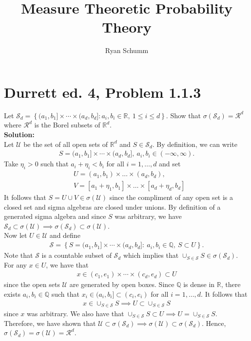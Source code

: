 \documentclass[12pt]{article}
\title{Measure Theoretic Probability Theory}
\author{Ryan Schumm}
\date{}
\newcommand{\Sd}{\mathcal{S}_d}
\newcommand{\U}{\mathcal{U}}
\begin{document}
    \maketitle
    \setlength{\parindent}{0pt}

    \section*{Durrett ed. 4, Problem 1.1.3}
    Let $\mathcal{S}_d = \left\{(a_1, b_1]\times\cdots\times(a_d, b_d]: a_i, b_i\in\mathbb R, \ 1 \leq i \leq d\right\}$. Show that 
    $\sigma\left(\mathcal S_d\right) = \mathcal R^d$ where $\mathcal R^d$ is the Borel subsets of $\mathbb R^d$.\\

    \textbf{Solution:}\\
    Let $\U$ be the set of all open sets of $\mathbb R^d$ and $S\in\Sd$. By definition, we can write
    \begin{align*}
        S = (a_1, b_1]\times\cdots\times(a_d, b_d], \ a_i, b_i\in(-\infty, \infty).
    \end{align*}
    Take $\eta_i > 0$ such that $a_i + \eta_i < b_i$ for all $i = 1,\ldots,d$ and set 
    \begin{align}
        &U = (a_1, b_1)\times\ldots\times(a_d, b_d),\\
        &V = [a_1 + \eta_1, b_1]\times\ldots\times[a_d + \eta_d, b_d]
    \end{align}
    It follows that $S = U \cup V\in\sigma(\U)$ since the compliment of any open set is a closed set and sigma algebras are closed under unions. By definition 
    of a generated sigma algebra and since $S$ was arbitrary, we have $\Sd\subset\sigma(\U)\implies\sigma(\Sd)\subset\sigma(\U)$.\\

    Now let $U\in\U$ and define
    \begin{align}
        \label{rat-recs}
        \mathscr S = \left\{S = (a_1, b_1]\times\cdots\times(a_d, b_d]: \ a_i, b_i\in\mathbb Q, \ S\subset U \right\}.
    \end{align}
    Note that $\mathscr S$ is a countable subset of $\Sd$ which implies that $\cup_{S\in \mathscr S}S\in \sigma(\Sd)$. For any $x \in U$, we have that 
    \begin{align}
        x\in(c_1, e_1)\times\cdots\times(c_d, e_d)\subset U
    \end{align}
    since the open sets $\U$ are generated by open boxes. Since $\mathbb Q$ is dense in $\mathbb R$, there exists $a_i, b_i\in\mathbb Q$ such that 
    $x_i\in(a_i, b_i]\subset (c_i, e_i)$ for all $i=1,\ldots,d$. It follows that 
    \begin{align}
        x\in\cup_{S\in \mathscr S}S\implies U\subset\cup_{S\in \mathscr S}S
    \end{align}
    since $x$ was
    arbitrary. We also have that $\cup_{S\in \mathscr S}S\subset U \implies U = \cup_{S\in \mathscr S}S$. Therefore, we have shown that
    $\U\subset \sigma(\Sd)\implies \sigma(\U)\subset \sigma(\Sd)$. Hence, $\sigma(\Sd) = \sigma(\U) = \mathcal R^d$.
    
\end{document}

